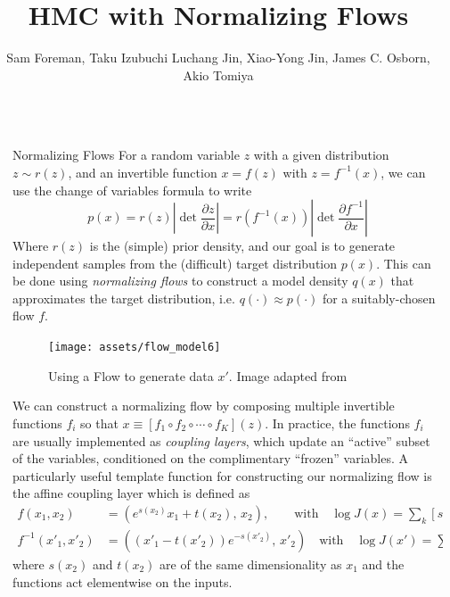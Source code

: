 \documentclass[final]{beamer}
\title{HMC with Normalizing Flows}
\author{Sam Foreman\inst{1}, Taku Izubuchi\inst{2} Luchang Jin\inst{3}, Xiao-Yong Jin\inst{1}, James C. Osborn\inst{1},
Akio Tomiya\inst{3}}
\institute[shortinst]{\inst{1} Argonne National Laboratory \inst{2} RIKEN-BNL \inst{3} University of Connecticut}
\newlength{\sepwidth}
\newlength{\colwidth}
\newcommand{\separatorcolumn}{\begin{column}{\sepwidth}\end{column}}
\begin{document}
\begin{frame}[t]
\begin{columns}[t]
\separatorcolumn

\begin{column}{\colwidth}

  \begin{block}{Normalizing Flows}
    For a random variable \(z\) with a given distribution \(z \sim r(z)\), and an invertible function \(x = f(z)\) with
    \(z = f^{-1}(x)\), we can use the change of variables formula to write
    \begin{equation}
      p(x) = r(z)\left|\det{\frac{\partial z}{\partial x}}\right|
           = r{(f^{-1}(x))}\left|\det{\frac{\partial f^{-1}}{\partial x}}\right|
    \end{equation}
    Where \(r(z)\) is the (simple) prior density, and our goal is to generate independent samples from the (difficult)
    target distribution \(p(x)\).
    This can be done using \emph{normalizing flows} to construct a model density \(q(x)\) that approximates the target
    distribution, i.e. \(q(\cdot)\approx p(\cdot)\) for a suitably-chosen flow \(f\).
    \begin{figure}%
      \texttt{[image: assets/flow\_model6]}
      \caption{\label{fig:flow_model}Using a Flow to generate data \(x'\). Image adapted from~\cite{weng2018flow}}
    \end{figure}

    We can construct a normalizing flow by composing multiple invertible functions \(f_{i}\) so that \(x\equiv [f_1\circ
    f_{2}\circ \cdots \circ f_{K}](z)\).
    In practice, the functions \(f_{i}\) are usually implemented as \emph{coupling layers}, which update an ``active''
    subset of the variables, conditioned on the complimentary ``frozen'' variables.
    A particularly useful template function for constructing our normalizing flow is the affine coupling layer which is
    defined as 
    \begin{align}
      f(x_{1}, x_{2}) &= \left(e^{s(x_{2})} x_{1} + t(x_{2}),\, x_{2}\right),%
        \quad\quad\text{with}\quad \log J(x) = \sum_{k}[s(x_{2})]_{k} \\
      f^{-1}(x'_{1}, x'_{2}) &= \left((x'_{1}-t(x'_{2}))e^{-s(x'_{2})},\, x'_{2}\right)%
        \quad\text{with}\quad \log J(x') = \sum_{k}-[s(x'_{2})]_{k}
    \end{align}
    where \(s(x_{2})\) and \(t(x_{2})\) are of the same dimensionality as \(x_{1}\) and the functions act elementwise on
    the inputs.


\end{block}
\end{column}
\end{columns}
\end{frame}
\end{document}
